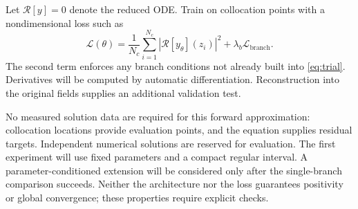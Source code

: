 \documentclass[12pt,a4paper]{article}
\begin{document}
Let $\mathcal{R}[y]=0$ denote the reduced ODE. Train on collocation points with a nondimensional loss such as
\begin{equation}
\mathcal{L}(\theta)=
\frac{1}{N_c}\sum_{i=1}^{N_c}|\mathcal{R}[y_\theta](z_i)|^2
+\lambda_b\mathcal{L}_{\mathrm{branch}}.
\end{equation}
The second term enforces any branch conditions not already built into \eqref{eq:trial}. Derivatives will be computed by automatic differentiation. Reconstruction into the original fields supplies an additional validation test.

No measured solution data are required for this forward approximation: collocation locations provide evaluation points, and the equation supplies residual targets. Independent numerical solutions are reserved for evaluation. The first experiment will use fixed parameters and a compact regular interval. A parameter-conditioned extension will be considered only after the single-branch comparison succeeds. Neither the architecture nor the loss guarantees positivity or global convergence; these properties require explicit checks.

\newpage
\end{document}
